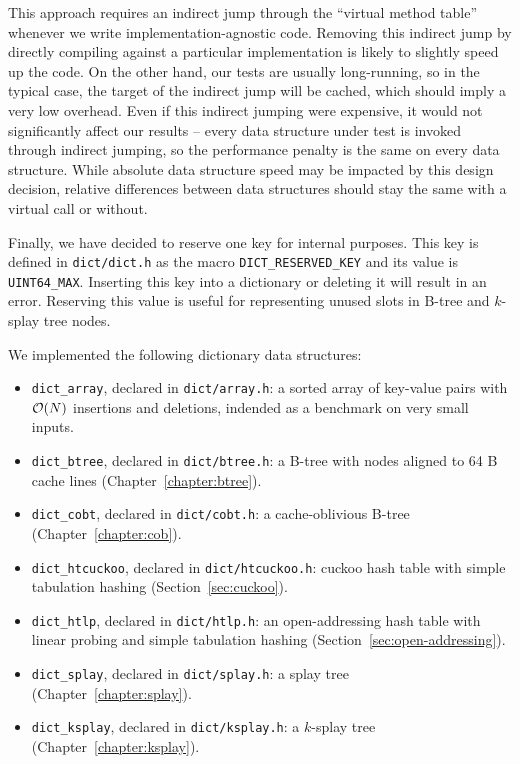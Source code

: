 This approach requires an indirect jump through the ``virtual method table''
whenever we write implementation-agnostic code. Removing this indirect jump
by directly compiling against a particular implementation is likely to slightly
speed up the code. On the other hand, our tests are usually long-running, so in
the typical case, the target of the indirect jump will be cached, which should
imply a very low overhead. Even if this indirect jumping were expensive, it
would not significantly affect our results -- every data structure under test
is invoked through indirect jumping, so the performance penalty is the same
on every data structure. While absolute data structure speed may be impacted
by this design decision, relative differences between data structures should
stay the same with a virtual call or without.

Finally, we have decided to reserve one key for internal purposes.
This key is defined in \texttt{dict/dict.h} as the macro
\texttt{DICT\_RESERVED\_KEY} and its value is \texttt{UINT64\_MAX}.
Inserting this key into a dictionary or deleting it will result in an error.
Reserving this value is useful for representing unused slots in B-tree
and $k$-splay tree nodes.

We implemented the following dictionary data structures:
\begin{itemize}
\item \texttt{dict\_array}, declared in \texttt{dict/array.h}:
	a sorted array of key-value pairs with $\mathcal{O}(N)$ insertions and deletions,
	indended as a benchmark on very small inputs.
\item \texttt{dict\_btree}, declared in \texttt{dict/btree.h}:
	a B-tree with nodes aligned to 64 B cache lines
	(Chapter~\ref{chapter:btree}).
\item \texttt{dict\_cobt}, declared in \texttt{dict/cobt.h}:
	a cache-oblivious B-tree (Chapter~\ref{chapter:cob}).
\item \texttt{dict\_htcuckoo}, declared in \texttt{dict/htcuckoo.h}:
	cuckoo hash table with simple tabulation hashing
	(Section~\ref{sec:cuckoo}).
\item \texttt{dict\_htlp}, declared in \texttt{dict/htlp.h}:
	an open-addressing hash table with linear probing and simple tabulation
	hashing (Section~\ref{sec:open-addressing}).
\item \texttt{dict\_splay}, declared in \texttt{dict/splay.h}:
	a splay tree (Chapter~\ref{chapter:splay}).
\item \texttt{dict\_ksplay}, declared in \texttt{dict/ksplay.h}:
	a $k$-splay tree (Chapter~\ref{chapter:ksplay}). %
\end{itemize}

